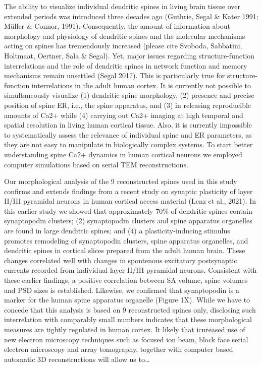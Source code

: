 \documentclass[fleqn,10pt]{wlscirep}
\begin{document}
	The ability to visualize individual dendritic spines in living brain tissue over extended periods was introduced three decades ago (Guthrie, Segal \& Kater 1991; Müller \& Connor, 1991). Consequently, the amount of information about morphology and physiology of dendritic spines and the molecular mechanisms acting on spines has tremendously increased (please cite Svoboda, Sabbatini, Holtmaat, Oertner, Sala \& Segal). Yet, major issues regarding structure-function interrelations and the role of dendritic spines in network function and memory mechanisms remain unsettled (Segal 2017). This is particularly true for structure-function interrelations in the adult human cortex. It is currently not possible to simultaneously visualize (1) dendritic spine morphology, (2) presence and precise position of spine ER, i.e., the spine apparatus, and (3) in releasing reproducible amounts of Ca2+ while (4) carrying out Ca2+ imaging at high temporal and spatial resolution in living human cortical tissue. Also, it is currently impossible to systematically assess the relevance of individual spine and ER parameters, as they are not easy to manipulate in biologically complex systems. To start better understanding spine Ca2+ dynamics in human cortical neurons we employed computer simulations based on serial TEM reconstructions.

	Our morphological analysis of the 9 reconstructed spines used in this study confirms and extends findings from a recent study on synaptic plasticity of layer II/III pyramidal neurons in human cortical access material (Lenz et al., 2021). In this earlier study we showed that approximately 70\% of dendritic spines contain synaptopodin clusters; (2) synaptopodin clusters and spine apparatus organelles are found in large dendritic spines; and (4) a plasticity-inducing stimulus promotes remodeling of synaptopodin clusters, spine apparatus organelles, and dendritic spines in cortical slices prepared from the adult human brain. These changes correlated well with changes in spontenous excitatory postsynaptic currents recorded from individual layer II/III pyramidal neurons. Consistent with these earlier findings, a positive correlation between SA volume, spine volumes and PSD sizes is established. Likewise, we confirmed that synaptopodin is a marker for the human spine apparatus organelle (Figure 1X). While we have to concede that this analysis is based on 9 reconstructed spines only, disclosing such interrelation with comparably small numbers indicates that these morphological measures are tightly regulated in human cortex. It likely that icnreased use of new electron microscopy techniques such as focused ion beam, block face serial electron microscopy and array tomography, together with computer based automatic 3D reconstructions will allow us to…
\end{document}
